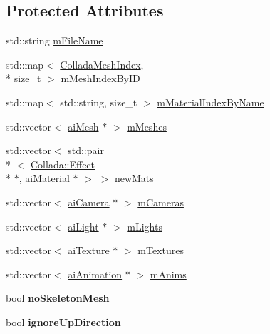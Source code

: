 \subsection*{Protected Attributes}
\begin{DoxyCompactItemize}
\item 
std\+::string \hyperlink{class_assimp_1_1_collada_loader_a07c07f08414391b0684de4651396b5b3}{m\+File\+Name}
\item 
std\+::map$<$ \hyperlink{struct_assimp_1_1_collada_mesh_index}{Collada\+Mesh\+Index}, \\*
size\+\_\+t $>$ \hyperlink{class_assimp_1_1_collada_loader_a68daccdd41b732f9c6a8f59a55e3e3d4}{m\+Mesh\+Index\+By\+I\+D}
\item 
std\+::map$<$ std\+::string, size\+\_\+t $>$ \hyperlink{class_assimp_1_1_collada_loader_a1086d5de6cf2cf2e9d0db608db10f52c}{m\+Material\+Index\+By\+Name}
\item 
std\+::vector$<$ \hyperlink{structai_mesh}{ai\+Mesh} $\ast$ $>$ \hyperlink{class_assimp_1_1_collada_loader_a6bb252f1dd881fda84f7575877836068}{m\+Meshes}
\item 
std\+::vector$<$ std\+::pair\\*
$<$ \hyperlink{struct_assimp_1_1_collada_1_1_effect}{Collada\+::\+Effect} \\*
$\ast$, \hyperlink{classai_material}{ai\+Material} $\ast$ $>$ $>$ \hyperlink{class_assimp_1_1_collada_loader_a1823f1e5da88ce3f3c45588c3723ca98}{new\+Mats}
\item 
std\+::vector$<$ \hyperlink{structai_camera}{ai\+Camera} $\ast$ $>$ \hyperlink{class_assimp_1_1_collada_loader_ae01b5e7ac7d5b81b39049caf5dcb51b2}{m\+Cameras}
\item 
std\+::vector$<$ \hyperlink{structai_light}{ai\+Light} $\ast$ $>$ \hyperlink{class_assimp_1_1_collada_loader_a5e90b34e54dab83fe030c855afdc6e41}{m\+Lights}
\item 
std\+::vector$<$ \hyperlink{structai_texture}{ai\+Texture} $\ast$ $>$ \hyperlink{class_assimp_1_1_collada_loader_aa9bd38aa446946f5160e4714615e8bab}{m\+Textures}
\item 
std\+::vector$<$ \hyperlink{structai_animation}{ai\+Animation} $\ast$ $>$ \hyperlink{class_assimp_1_1_collada_loader_a8d166d11cf816cd9a107aa0be4a0bdc1}{m\+Anims}
\item 
\hypertarget{class_assimp_1_1_collada_loader_a5bcb4fefad86a14c37105650c57bd90b}{bool {\bfseries no\+Skeleton\+Mesh}}\label{class_assimp_1_1_collada_loader_a5bcb4fefad86a14c37105650c57bd90b}

\item 
\hypertarget{class_assimp_1_1_collada_loader_a73add1da0e63c71ec26e2b667703503b}{bool {\bfseries ignore\+Up\+Direction}}\label{class_assimp_1_1_collada_loader_a73add1da0e63c71ec26e2b667703503b}

\end{DoxyCompactItemize}
